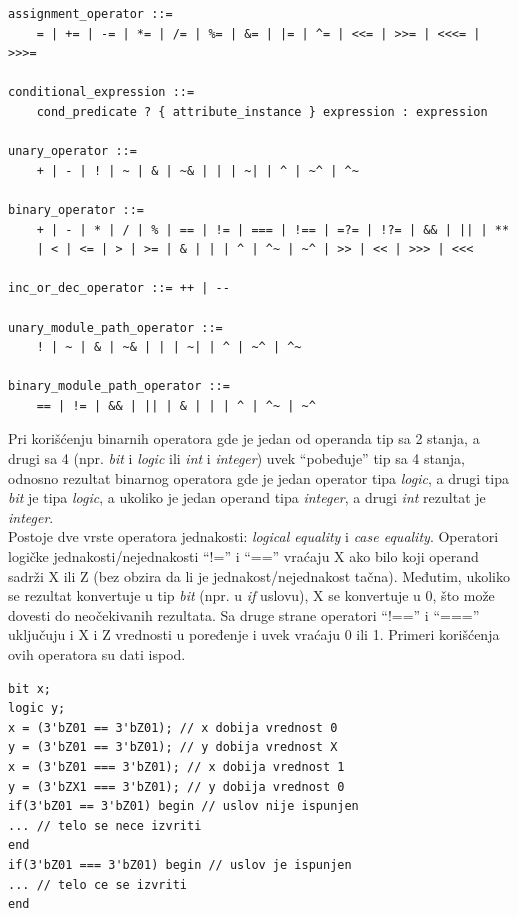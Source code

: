 \begin{verbatim}
assignment_operator ::=
    = | += | -= | *= | /= | %= | &= | |= | ^= | <<= | >>= | <<<= | >>>=

conditional_expression ::=
    cond_predicate ? { attribute_instance } expression : expression

unary_operator ::=
    + | - | ! | ~ | & | ~& | | | ~| | ^ | ~^ | ^~

binary_operator ::=
    + | - | * | / | % | == | != | === | !== | =?= | !?= | && | || | **
    | < | <= | > | >= | & | | | ^ | ^~ | ~^ | >> | << | >>> | <<<

inc_or_dec_operator ::= ++ | --

unary_module_path_operator ::=
    ! | ~ | & | ~& | | | ~| | ^ | ~^ | ^~

binary_module_path_operator ::=
    == | != | && | || | & | | | ^ | ^~ | ~^

\end{verbatim}

Pri korišćenju binarnih operatora gde je jedan od operanda tip sa 2 stanja, a
drugi sa 4 (npr. \emph{bit} i \emph{logic} ili \emph{int} i \emph{integer}) uvek
``pobeđuje'' tip sa 4 stanja, odnosno rezultat binarnog operatora gde je jedan
operator tipa \emph{logic}, a drugi tipa \emph{bit} je tipa \emph{logic}, a
ukoliko je jedan operand tipa \emph{integer}, a drugi \emph{int} rezultat je
\emph{integer}.\\

Postoje dve vrste operatora jednakosti: \emph{logical equality} i \emph{case
  equality}.
Operatori logičke jednakosti/nejednakosti ``!='' i ``=='' vraćaju X ako bilo
koji operand sadrži X ili Z (bez obzira da li je jednakost/nejednakost tačna).
Međutim, ukoliko se rezultat konvertuje u tip \emph{bit} (npr. u \emph{if}
uslovu), X se konvertuje u 0, što može dovesti do neočekivanih rezultata.
Sa druge strane operatori ``!=='' i ``==='' uključuju i X i Z vrednosti u
poređenje i uvek vraćaju 0 ili 1.
Primeri korišćenja ovih operatora su dati ispod.

\begin{lstlisting}
bit x;
logic y;
x = (3'bZ01 == 3'bZ01); // x dobija vrednost 0
y = (3'bZ01 == 3'bZ01); // y dobija vrednost X
x = (3'bZ01 === 3'bZ01); // x dobija vrednost 1
y = (3'bZX1 === 3'bZ01); // y dobija vrednost 0
if(3'bZ01 == 3'bZ01) begin // uslov nije ispunjen
... // telo se nece izvriti
end
if(3'bZ01 === 3'bZ01) begin // uslov je ispunjen
... // telo ce se izvriti
end
\end{lstlisting}

